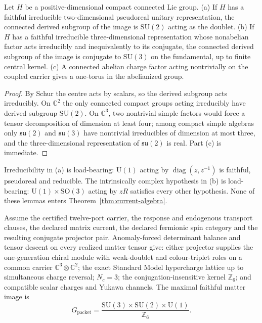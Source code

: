 \documentclass[11pt]{article}
\begin{document}
\begin{lemma}
\label{lem:factor-identification}
Let \(H\) be a positive-dimensional compact connected Lie group.
(a) If \(H\) has a faithful irreducible two-dimensional pseudoreal unitary
representation, the connected derived subgroup of the image is
\(\mathrm{SU}(2)\) acting as the doublet. (b) If \(H\) has a faithful
irreducible three-dimensional representation whose nonabelian factor acts
irreducibly and inequivalently to its conjugate, the connected derived
subgroup of the image is conjugate to \(\mathrm{SU}(3)\) on the fundamental,
up to finite central kernel. (c) A connected abelian charge factor acting
nontrivially on the coupled carrier gives a one-torus in the abelianized
group.
\end{lemma}

\begin{proof}
By Schur the centre acts by scalars, so the derived subgroup acts
irreducibly. On \(\mathbb C^2\) the only connected compact groups acting
irreducibly have derived subgroup \(\mathrm{SU}(2)\). On \(\mathbb C^3\), two
nontrivial simple factors would force a tensor decomposition of dimension at
least four; among compact simple algebras only \(\mathfrak{su}(2)\) and
\(\mathfrak{su}(3)\) have nontrivial irreducibles of dimension at most three,
and the three-dimensional representation of \(\mathfrak{su}(2)\) is real.
Part (c) is immediate.
\end{proof}

Irreducibility in (a) is load-bearing: \(\mathrm U(1)\) acting by
\(\operatorname{diag}(z,z^{-1})\) is faithful, pseudoreal and reducible. The
intrinsically complex hypothesis in (b) is load-bearing:
\(\mathrm U(1)\times\mathrm{SO}(3)\) acting by \(zR\) satisfies every other
hypothesis. None of these lemmas enters Theorem~\ref{thm:current-algebra}.

\begin{proposition}
\label{prop:conditional-matter-image}
Assume the certified twelve-port carrier, the response and endogenous
transport clauses, the declared matrix current, the declared fermionic spin
category and the resulting conjugate projector pair. Anomaly-forced
determinant balance and tensor descent on every realized matter tensor give:
either projector supplies the one-generation chiral module with weak-doublet
and colour-triplet roles on a common carrier \(\mathbb C^3\otimes\mathbb C^2\);
the exact Standard Model hypercharge lattice up to simultaneous charge
reversal; \(N_c=3\); the conjugation-insensitive kernel \(\mathbb Z_6\); and
compatible scalar charges and Yukawa channels. The maximal faithful matter
image is
\[
G_{\mathrm{packet}}=
\frac{\mathrm{SU}(3)\times\mathrm{SU}(2)\times\mathrm U(1)}{\mathbb Z_6}.
\]
\end{proposition}
\end{document}
